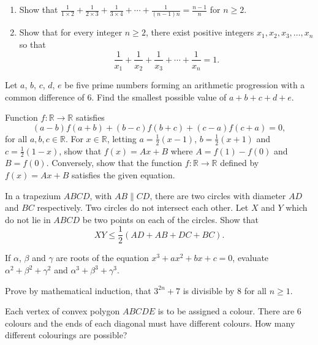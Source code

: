 \begin{problems}
    \problem
    \begin{enumerate}
        \item Show that $\frac{1}{1 \times 2} + \frac{1}{2 \times 3} +
            \frac{1}{3 \times 4} + \cdots + \frac{1}{(n - 1)n} = \frac{n -
            1}{n}$ for $n \geq 2$. 
        
        \item Show that for every integer $n \geq 2$, there exist positive
            integers $x_{1}, x_{2}, x_{3}, \ldots, x_{n}$ so that 
            \[ \frac{1}{x_{1}} + \frac{1}{x_{2}} + \frac{1}{x_{3}} + \cdots +
            \frac{1}{x_{n}} = 1.\] 
    \end{enumerate}
    
    \problem Let $a$, $b$, $c$, $d$, $e$ be five prime numbers forming an
    arithmetic progression with a common difference of 6. Find the smallest
    possible value of $a + b + c + d + e$. 
    
    \problem Function $f:\mathbb{R} \rightarrow \mathbb{R}$ satisfies 
    \[(a - b)f(a + b) + (b - c)f(b + c) + (c - a)f(c + a) = 0,\] 
    for all $a, b, c \in \mathbb{R}$. For $x \in \mathbb{R}$, letting $a =
    \frac{1}{2}(x - 1)$, $b = \frac{1}{2}(x + 1)$ and $c = \frac{1}{2}(1 - x)$,
    show that $f(x) = Ax + B$ where $A = f(1) - f(0)$ and $B = f(0)$.
    Conversely, show that the function $f:\mathbb{R} \rightarrow \mathbb{R}$
    defined by $f(x) = Ax + B$ satisfies the given equation. 
    
    \problem In a trapezium $ABCD$, with $AB \parallel CD$, there are two
    circles with diameter $AD$ and $BC$ respectively. Two circles do not
    intersect each other. Let $X$ and $Y$ which do not lie in $ABCD$ be two
    points on each of the circles. Show that 
    \[XY \leq \frac{1}{2}(AD + AB + DC + BC).\]
    
    \problem If $\alpha$, $\beta$ and $\gamma$ are roots of the equation $x^3 +
    ax^2 + bx + c = 0$, evaluate $\alpha^2 + \beta^2 + \gamma^2$ and $\alpha^3
    + \beta^3 + \gamma^3$. 
    
    \problem Prove by mathematical induction, that $3^{2n} + 7$ is divisible by
    8 for all $n \geq 1$. 
    
    \problem Each vertex of convex polygon $ABCDE$ is to be assigned a colour.
    There are 6 colours and the ends of each diagonal must have different
    colours. How many different colourings are possible?
\end{problems}
